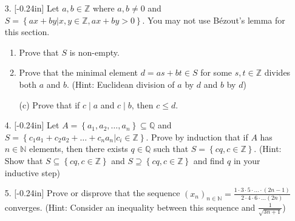 \documentclass[letterpaper,12pt]{article}
\newcommand{\set}[1]{\left\{ #1 \right\}}
\theoremstyle{definition}
\begin{document}
\pagebreak
\begin{enumerate}
    \item[3. ]\reversemarginpar{}[-0.24in] Let $a,b \in \mathbb{Z}$ where $a,b \neq 0$ and $S = \set{ax + by | x,y \in \mathbb{Z}, ax + by > 0}$. You may not use Bézout's lemma for this section. \begin{enumerate}
        \item Prove that $S$ is non-empty. 
            \vspace{1.1in}
        \item Prove that the minimal element $d = as + bt \in S$ for some $s,t \in \mathbb{Z}$ divides both $a$ and $b$. (Hint: Euclidean division of $a$ by $d$ and $b$ by $d$)
    \end{enumerate}
\end{enumerate}
\pagebreak
\begin{enumerate}
    \item[] \begin{enumerate}
        \item[(c)] Prove that if $c \mid a$ and $c \mid b$, then $c \leq d$.
    \end{enumerate}
\end{enumerate}
\pagebreak
\begin{enumerate}
    \item[4.]\reversemarginpar{}[-0.24in] 
  Let $A = \set{a_1,a_2,\ldots,a_n} \subseteq \mathbb{Q}$ and $S = \set{c_1a_1 + c_2a_2 + \ldots + c_n a_n | c_i  \in \mathbb{Z}}$. Prove by induction that if $A$ has $n \in \mathbb{N}$ elements, then there exists $q \in \mathbb{Q}$ such that $S = \set{cq, c \in \mathbb{Z}}$. (Hint: Show that $S \subseteq \set{cq, c \in \mathbb{Z}}$ and $S \supseteq \set{cq, c \in \mathbb{Z}}$ and find $q$ in your inductive step)
\end{enumerate}
\pagebreak
\begin{enumerate}
    \item[5.] \reversemarginpar{}[-0.24in] Prove or disprove that the sequence $(x_n)_{n \in \mathbb{N}} = \frac{1\cdot 3 \cdot 5 \cdot \ldots \cdot (2n-1)}{2 \cdot 4 \cdot 6 \cdot \ldots (2n)}$ converges. (Hint: Consider an inequality between this sequence and $\frac{1}{\sqrt{3n+1}}$)
\end{enumerate}
\end{document}
